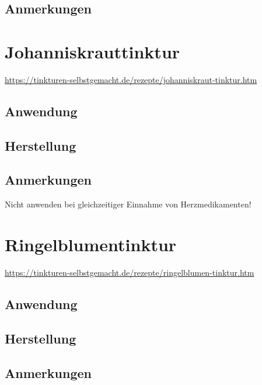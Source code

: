 \subsection{Anmerkungen}







\section{Johanniskrauttinktur}

\cite{tinkturen} 

\url{https://tinkturen-selbstgemacht.de/rezepte/johanniskraut-tinktur.htm}


\subsection{Anwendung}

\subsection{Herstellung}

\subsection{Anmerkungen}

Nicht anwenden bei gleichzeitiger Einnahme von Herzmedikamenten!





\section{Ringelblumentinktur}

\cite{tinkturen}

\url{https://tinkturen-selbstgemacht.de/rezepte/ringelblumen-tinktur.htm}


\subsection{Anwendung}

\subsection{Herstellung}

\subsection{Anmerkungen}






